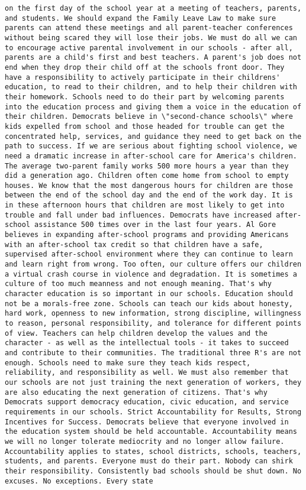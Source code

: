 \documentclass[
]{article}
\begin{document}
\begin{verbatim}
on the first day of the school year at a meeting of teachers, parents, and students. We should expand the Family Leave Law to make sure parents can attend these meetings and all parent-teacher conferences without being scared they will lose their jobs. We must do all we can to encourage active parental involvement in our schools - after all, parents are a child's first and best teachers. A parent's job does not end when they drop their child off at the schools front door. They have a responsibility to actively participate in their childrens' education, to read to their children, and to help their children with their homework. Schools need to do their part by welcoming parents into the education process and giving them a voice in the education of their children. Democrats believe in \"second-chance schools\" where kids expelled from school and those headed for trouble can get the concentrated help, services, and guidance they need to get back on the path to success. If we are serious about fighting school violence, we need a dramatic increase in after-school care for America's children. The average two-parent family works 500 more hours a year than they did a generation ago. Children often come home from school to empty houses. We know that the most dangerous hours for children are those between the end of the school day and the end of the work day. It is in these afternoon hours that children are most likely to get into trouble and fall under bad influences. Democrats have increased after-school assistance 500 times over in the last four years. Al Gore believes in expanding after-school programs and providing Americans with an after-school tax credit so that children have a safe, supervised after-school environment where they can continue to learn and learn right from wrong. Too often, our culture offers our children a virtual crash course in violence and degradation. It is sometimes a culture of too much meanness and not enough meaning. That's why character education is so important in our schools. Education should not be a morals-free zone. Schools can teach our kids about honesty, hard work, openness to new information, strong discipline, willingness to reason, personal responsibility, and tolerance for different points of view. Teachers can help children develop the values and the character - as well as the intellectual tools - it takes to succeed and contribute to their communities. The traditional three R's are not enough. Schools need to make sure they teach kids respect, reliability, and responsibility as well. We must also remember that our schools are not just training the next generation of workers, they are also educating the next generation of citizens. That's why Democrats support democracy education, civic education, and service requirements in our schools. Strict Accountability for Results, Strong Incentives for Success. Democrats believe that everyone involved in the education system should be held accountable. Accountability means we will no longer tolerate mediocrity and no longer allow failure. Accountability applies to states, school districts, schools, teachers, students, and parents. Everyone must do their part. Nobody can shirk their responsibility. Consistently bad schools should be shut down. No excuses. No exceptions. Every state 
\end{verbatim}
\end{document}
